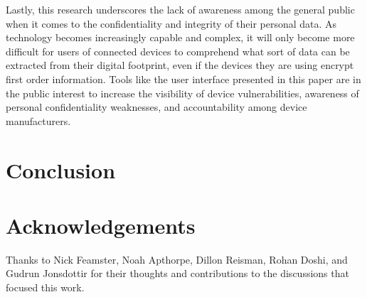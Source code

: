 Lastly, this research underscores the lack of awareness among the general public when it comes to the confidentiality and integrity of their personal data. As technology becomes increasingly capable and complex, it will only become more difficult for users of connected devices to comprehend what sort of data can be extracted from their digital footprint, even if the devices they are using encrypt first order information. Tools like the user interface presented in this paper are in the public interest to increase the visibility of device vulnerabilities, awareness of personal confidentiality weaknesses, and accountability among device manufacturers.


\section{Conclusion}


\appendix

\section*{Acknowledgements}
Thanks to Nick Feamster, Noah Apthorpe, Dillon Reisman, Rohan Doshi, and Gudrun Jonsdottir for their thoughts and contributions to the discussions that focused this work. 
